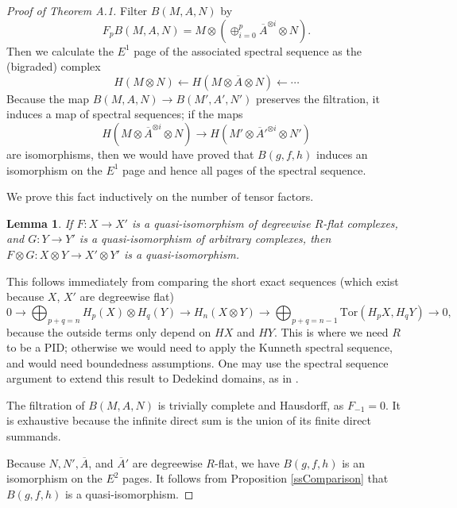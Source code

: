 \documentclass{memo-l}
\newtheorem{lemma}[theorem]{Lemma}
\theoremstyle{definition}
\theoremstyle{remark}
\numberwithin{section}{chapter}
\numberwithin{equation}{chapter}
\begin{document}
\begin{proof}[Proof of Theorem A.1]
Filter $B(M,A,N)$ by $$F_p B(M,A,N) = M \otimes \left(\oplus_{i=0}^p \overline A^{\otimes i} \otimes N\right).$$ Then we calculate the $E^1$ page of the associated spectral sequence as the (bigraded) complex $$H(M \otimes N) \leftarrow H(M \otimes \overline A \otimes N) \leftarrow \cdots$$ Because the map $B(M,A,N) \to B(M',A',N')$ preserves the filtration, it induces a map of spectral sequences; if the maps $$H(M \otimes \overline A^{\otimes i} \otimes N) \to H(M' \otimes \overline A'^{\otimes i} \otimes N')$$ are isomorphisms, then we would have proved that $B(g,f,h)$ induces an isomorphism on the $E^1$ page and hence all pages of the spectral sequence.

We prove this fact inductively on the number of tensor factors. 

\begin{lemma}If $F: X \to X'$ is a quasi-isomorphism of degreewise $R$-flat complexes, and $G: Y \to Y'$ is a quasi-isomorphism of arbitrary complexes, then $F \otimes G: X \otimes Y \to X' \otimes Y'$ is a quasi-isomorphism.
\end{lemma}

This follows immediately from comparing the short exact sequences (which exist because $X$, $X'$ are degreewise flat)
$$0 \to \bigoplus_{p+q=n} H_p(X) \otimes H_q(Y) \to H_n(X \otimes Y) \to \bigoplus_{p+q=n-1} \text{Tor}(H_p X, H_qY) \to 0,$$
because the outside terms only depend on $HX$ and $HY$. This is where we need $R$ to be a PID; otherwise we would need to apply the Kunneth spectral sequence, and would need boundedness assumptions. One may use the spectral sequence argument to extend this result to Dedekind domains, as in \cite[Lemma~2.2]{kriz1995operads}. 

The filtration of $B(M,A,N)$ is trivially complete and Hausdorff, as $F_{-1} = 0$. It is exhaustive because the infinite direct sum is the union of its finite direct summands.

Because $N, N', \overline A$, and $\overline A'$ are degreewise $R$-flat, we have $B(g,f,h)$ is an isomorphism on the $E^2$ pages. It follows from Proposition \ref{ssComparison} that $B(g,f,h)$ is a quasi-isomorphism.
\end{proof}
\end{document}
